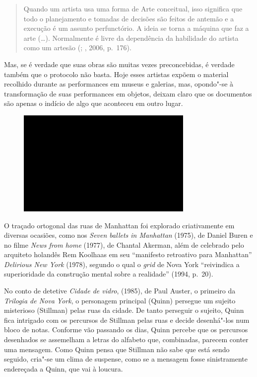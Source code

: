 \begin{quote}
Quando um artista usa uma forma de Arte conceitual, isso significa que
todo o planejamento e tomadas de decisões são feitos de antemão e a
execução é um assunto perfunctório. A ideia se torna a máquina que faz a
arte (\ldots{}). Normalmente é livre da dependência da habilidade do artista
como um artesão (; , 2006, p.~176).
\end{quote}

Mas, se é verdade que suas obras são muitas vezes preconcebidas, é
verdade também que o protocolo não basta. Hoje esses artistas expõem o
material recolhido durante as performances em museus e galerias, mas,
opondo"-se à transformação de suas performances em objetos, deixam claro
que os documentos são apenas o indício de algo que aconteceu em outro
lugar.

\begin{figure}[!ht]

\centering
 \includegraphics[width=85mm]{./imgs/im1.jpg}
\caption{\tiny{}}

\end{figure}

O traçado ortogonal das ruas de Manhattan foi explorado criativamente em
diversas ocasiões, como nos \emph{Seven ballets in Manhattan} (1975), de
Daniel Buren e no filme \emph{News from home} (1977), de Chantal
Akerman, além de celebrado pelo arquiteto holandês Rem Koolhaas em seu
``manifesto retroativo para Manhattan'' \emph{Delirious New York}
(1978), segundo o qual o \emph{grid} de Nova York ``reivindica a
superioridade da construção mental sobre a realidade'' (1994, p.~20).

No conto de detetive \emph{Cidade de vidro}, (1985), de Paul Auster, o
primeiro da \emph{Trilogia de Nova York}, o personagem principal (Quinn)
persegue um sujeito misterioso (Stillman) pelas ruas da cidade. De tanto
perseguir o sujeito, Quinn fica intrigado com os percursos de Stillman
pelas ruas e decide desenhá"-los num bloco de notas. Conforme vão
passando os dias, Quinn percebe que os percursos desenhados se
assemelham a letras do alfabeto que, combinadas, parecem conter uma
mensagem. Como Quinn pensa que Stillman não sabe que está sendo seguido,
cria"-se um clima de suspense, como se a mensagem fosse sinistramente
endereçada a Quinn, que vai à loucura.

